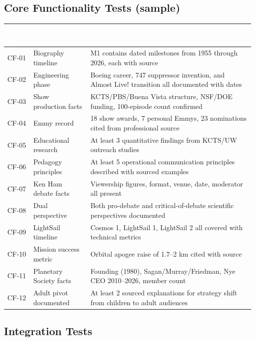 \documentclass[11pt,letterpaper]{article}
\newcommand{\tableheader}[1]{\textbf{\sffamily\textcolor{white}{#1}}}
\begin{document}
\subsection{Core Functionality Tests (sample)}

\begin{center}
\begin{tabularx}{\textwidth}{C{1.5cm}L{3.5cm}X}
\toprule
{}
\tableheader{Test ID} & \tableheader{Verifies} & \tableheader{Expected} \\
\midrule
CF-01 & Biography timeline & M1 contains dated milestones from 1955 through 2026, each with source \\
CF-02 & Engineering phase & Boeing career, 747 suppressor invention, and Almost Live! transition all documented with dates \\
CF-03 & Show production facts & KCTS/PBS/Buena Vista structure, NSF/DOE funding, 100-episode count confirmed \\
CF-04 & Emmy record & 18 show awards, 7 personal Emmys, 23 nominations cited from professional source \\
CF-05 & Educational research & At least 3 quantitative findings from KCTS/UW outreach studies \\
CF-06 & Pedagogy principles & At least 5 operational communication principles described with sourced examples \\
CF-07 & Ken Ham debate facts & Viewership figures, format, venue, date, moderator all present \\
CF-08 & Dual perspective & Both pro-debate and critical-of-debate scientific perspectives documented \\
CF-09 & LightSail timeline & Cosmos 1, LightSail 1, LightSail 2 all covered with technical metrics \\
CF-10 & Mission success metric & Orbital apogee raise of 1.7--2 km cited with source \\
CF-11 & Planetary Society facts & Founding (1980), Sagan/Murray/Friedman, Nye CEO 2010--2026, member count \\
CF-12 & Adult pivot documented & At least 2 sourced explanations for strategy shift from children to adult audiences \\
\bottomrule
\end{tabularx}
\end{center}

\subsection{Integration Tests}
\end{document}

